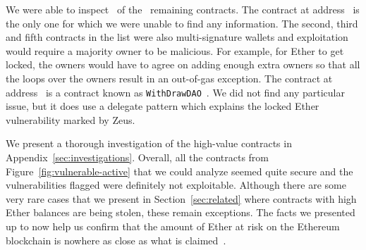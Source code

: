 We were able to inspect~ of the~ remaining contracts. The contract at address~ is the only one for which we were unable to find any information. The second, third and fifth contracts in the list were also multi-signature wallets and exploitation would require a majority owner to be malicious. For example, for Ether to get locked, the owners would have to agree on adding enough extra owners so that all the loops over the owners result in an out-of-gas exception. The contract at address~ is a contract known as \lstinline{WithDrawDAO}~\cite{withdraw-dao}. We did not find any particular issue, but it does use a delegate pattern which explains the locked Ether vulnerability marked by Zeus.

We present a thorough investigation of the high-value contracts in Appendix~\ref{sec:investigations}. Overall, all the contracts from Figure~\ref{fig:vulnerable-active} that we could analyze seemed quite secure and the vulnerabilities flagged were definitely not exploitable. Although there are some very rare cases that we present in Section~\ref{sec:related} where contracts with high Ether balances are being stolen, these remain exceptions. The facts we presented up to now help us confirm that the amount of Ether at risk on the Ethereum blockchain is nowhere as close as what is claimed~\cite{DBLP:conf/ndss/KalraGDS18,Grech2018}.


